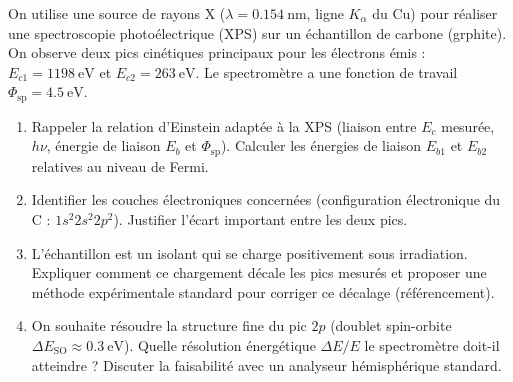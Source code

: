 \documentclass[11pt]{article}
\begin{document}
\begin{exercice}
On utilise une source de rayons X ($\lambda = \SI{0,154}{\nano\metre}$, ligne $K_\alpha$ du Cu) pour réaliser une spectroscopie photoélectrique (XPS) sur un échantillon de carbone (grphite). On observe deux pics cinétiques principaux pour les électrons émis : $E_{c1} = \SI{1198}{\electronvolt}$ et $E_{c2} = \SI{263}{\electronvolt}$. Le spectromètre a une fonction de travail $\Phi_{\text{sp}} = \SI{4,5}{\electronvolt}$.
\begin{enumerate}
    \item Rappeler la relation d'Einstein adaptée à la XPS (liaison entre $E_c$ mesurée, $h\nu$, énergie de liaison $E_b$ et $\Phi_{\text{sp}}$). Calculer les énergies de liaison $E_{b1}$ et $E_{b2}$ relatives au niveau de Fermi.
    \item Identifier les couches électroniques concernées (configuration électronique du C : $1s^2 2s^2 2p^2$). Justifier l'écart important entre les deux pics.
    \item L'échantillon est un isolant qui se charge positivement sous irradiation. Expliquer comment ce chargement décale les pics mesurés et proposer une méthode expérimentale standard pour corriger ce décalage (référencement).
    \item On souhaite résoudre la structure fine du pic $2p$ (doublet spin-orbite $\Delta E_{\text{SO}} \approx \SI{0,3}{\electronvolt}$). Quelle résolution énergétique $\Delta E / E$ le spectromètre doit-il atteindre ? Discuter la faisabilité avec un analyseur hémisphérique standard.
\end{enumerate}
\end{exercice}
\end{document}
